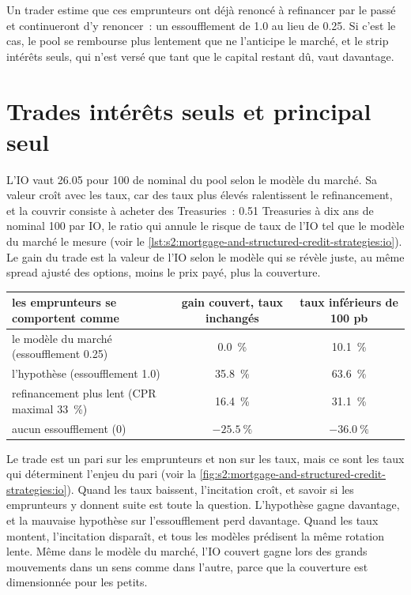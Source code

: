 Un trader estime que ces emprunteurs ont déjà renoncé à refinancer par le passé et continueront d'y renoncer~: un essoufflement de 1.0 au lieu de 0.25. Si c'est le cas, le pool
se rembourse plus lentement que ne l'anticipe le marché, et le strip intérêts seuls, qui n'est versé que tant que le capital restant dû, vaut davantage.

\section{Trades intérêts seuls et principal seul}

L'IO vaut 26.05 pour 100 de nominal du pool selon le modèle du marché. Sa valeur croît avec les taux, car des taux plus élevés ralentissent le refinancement, et la couvrir
consiste à acheter des Treasuries~: 0.51 Treasuries à dix ans de nominal 100 par IO, le ratio qui annule le risque de taux de l'IO tel que le modèle du marché le mesure
(voir le \cref{lst:s2:mortgage-and-structured-credit-strategies:io}). Le gain du trade est la valeur de l'IO selon le modèle qui se révèle juste, au
même spread ajusté des options, moins le prix payé, plus la couverture.

\begin{center}
\small
\begin{tabular}{@{}lcc@{}}
\toprule
les emprunteurs se comportent comme & gain couvert, taux inchangés & taux inférieurs de 100 pb\\
\midrule
le modèle du marché (essoufflement 0.25) & 0.0~\% & 10.1~\%\\
l'hypothèse (essoufflement 1.0) & 35.8~\% & 63.6~\%\\
refinancement plus lent (CPR maximal 33~\%) & 16.4~\% & 31.1~\%\\
aucun essoufflement (0) & $-25.5~\%$ & $-36.0~\%$\\
\bottomrule
\end{tabular}
\end{center}

Le trade est un pari sur les emprunteurs et non sur les taux, mais ce sont les taux qui déterminent l'enjeu du pari
(voir la \cref{fig:s2:mortgage-and-structured-credit-strategies:io}). Quand les taux baissent, l'incitation croît, et savoir si les emprunteurs y donnent suite est toute la
question. L'hypothèse gagne davantage, et la mauvaise hypothèse sur l'essoufflement perd davantage. Quand les taux montent, l'incitation disparaît, et tous les modèles prédisent la même
rotation lente. Même dans le modèle du marché, l'IO couvert gagne lors des grands mouvements dans un sens comme dans l'autre, parce que la couverture est dimensionnée pour les petits.

